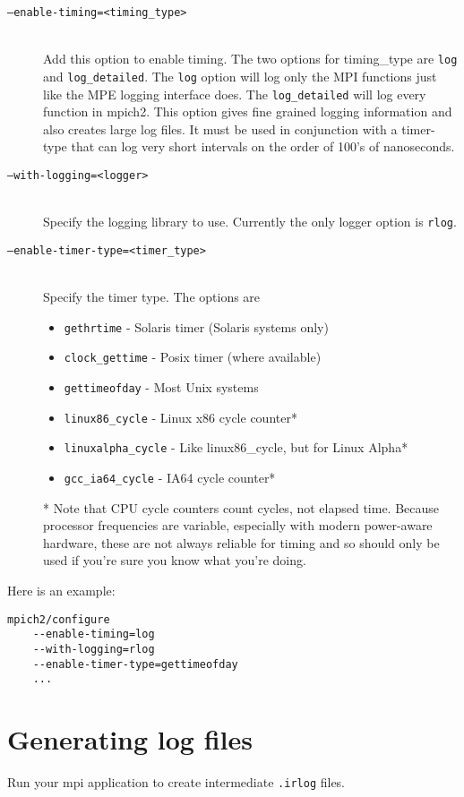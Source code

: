 \documentclass[dvipdfm,11pt]{article}
\begin{document}
\begin{description}
\item[\texttt{--enable-timing=<timing\_type>}]\mbox{}\\
Add this option to enable timing.  The two options for timing\_type are 
\texttt{log} and \texttt{log\_detailed}.  The \texttt{log} option will log 
only the MPI functions just like the MPE logging interface does.  The 
\texttt{log\_detailed} will log every function in mpich2.  This option gives 
fine grained logging information and also creates large log files.  It must 
be used in conjunction with a timer-type that can log very short intervals 
on the order of 100's of nanoseconds.

\item[\texttt{--with-logging=<logger>}]\mbox{}\\
Specify the logging library to use.  Currently the only logger option is \texttt{rlog}.

\item[\texttt{--enable-timer-type=<timer\_type>}]\mbox{}\\
Specify the timer type.  The options are
\begin{itemize}
\item \texttt{gethrtime} -
Solaris timer (Solaris systems only)
\item \texttt{clock\_gettime} -
Posix timer (where available)
\item \texttt{gettimeofday} -
Most Unix systems
\item \texttt{linux86\_cycle} -
Linux x86 cycle counter*
\item \texttt{linuxalpha\_cycle} -
Like linux86\_cycle, but for Linux Alpha*
\item \texttt{gcc\_ia64\_cycle} -
IA64 cycle counter*
\end{itemize}
* Note that CPU cycle counters count cycles, not elapsed time.
Because processor frequencies are variable, especially with modern
power-aware hardware, these are not always reliable for timing and so
should only be used if you're sure you know what you're doing.

\end{description}

Here is an example:
\begin{verbatim}
mpich2/configure
    --enable-timing=log
    --with-logging=rlog
    --enable-timer-type=gettimeofday
    ...
\end{verbatim}

\section{Generating log files}
\label{sec:genlogs}
Run your mpi application to create intermediate \texttt{.irlog} files.
\end{document}
